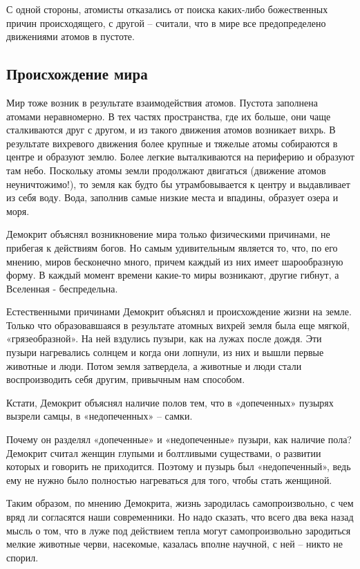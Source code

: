 \documentclass[a4paper, 14pt]{extreport}
\begin{document}
С одной стороны, атомисты отказались от поиска каких-либо божественных
причин происходящего, с другой -- считали, что в мире все предопределено
движениями атомов в пустоте.

\subsection{Происхождение мира}

Мир тоже возник в результате взаимодействия атомов. Пустота заполнена
атомами неравномерно. В тех частях пространства, где их больше, они чаще
сталкиваются друг с другом, и из такого движения атомов возникает вихрь.
В результате вихревого движения более крупные и тяжелые атомы собираются
в центре и образуют землю. Более легкие выталкиваются на периферию и
образуют там небо. Поскольку атомы земли продолжают двигаться (движение
атомов неуничтожимо!), то земля как будто бы утрамбовывается к центру и
выдавливает из себя воду. Вода, заполнив самые низкие места и впадины,
образует озера и моря.

Демокрит объяснял возникновение мира только физическими причинами, не
прибегая к действиям богов. Но самым удивительным является то, что, по
его мнению, миров бесконечно много, причем каждый из них имеет
шарообразную форму. В каждый момент времени какие-то миры возникают,
другие гибнут, а Вселенная - беспредельна.

Естественными причинами Демокрит объяснял и происхождение жизни на
земле. Только что образовавшаяся в результате атомных вихрей земля была
еще мягкой, «грязеобразной». На ней вздулись пузыри, как на лужах после
дождя. Эти пузыри нагревались солнцем и когда они лопнули, из них и
вышли первые животные и люди. Потом земля затвердела, а животные и люди
стали воспроизводить себя другим, привычным нам способом.

Кстати, Демокрит объяснял наличие полов тем, что в «допеченных» пузырях
вызрели самцы, в «недопеченных» -- самки.

Почему он разделял «допеченные» и «недопеченные» пузыри, как наличие
пола? Демокрит считал женщин глупыми и болтливыми существами, о развитии
которых и говорить не приходится. Поэтому и пузырь был «недопеченный»,
ведь ему не нужно было полностью нагреваться для того, чтобы стать
женщиной.

Таким образом, по мнению Демокрита, жизнь зародилась самопроизвольно, с
чем вряд ли согласятся наши современники. Но надо сказать, что всего два
века назад мысль о том, что в луже под действием тепла могут
самопроизвольно зародиться мелкие животные черви, насекомые, казалась
вполне научной, с ней -- никто не спорил.
\end{document}
